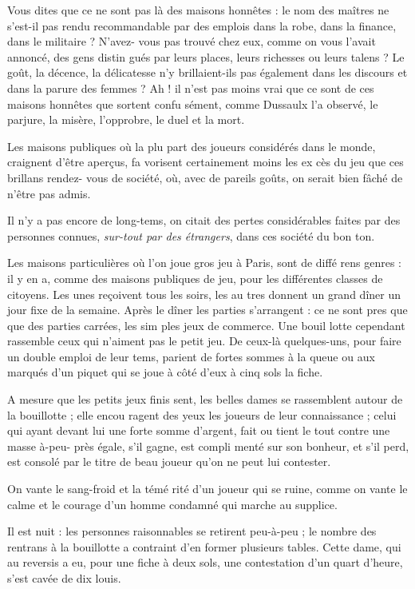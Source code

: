 Vous dites que ce ne sont pas là des
maisons honnêtes : le nom des maîtres
ne s'est-il pas rendu recommandable
par des emplois dans la robe, dans la
finance, dans le militaire ? N'avez-%
vous pas trouvé chez eux, comme on
vous l'avait annoncé, des gens distin%
gués par leurs places, leurs richesses
ou leurs talens ? Le goût, la décence,
la délicatesse n'y brillaient-ils pas
également dans les discours et dans
la parure des femmes ? Ah ! il n'est
pas moins vrai que ce sont de ces
maisons honnêtes que sortent confu%
sément, comme Dussaulx l'a observé,
le parjure, la misère, l'opprobre, le
duel et la mort.

Les maisons publiques où la plu%
part des joueurs considérés dans le
monde, craignent d'être aperçus, fa%
vorisent certainement moins les ex%
cès du jeu que ces brillans rendez-%
vous de société, où, avec de pareils
goûts, on serait bien fâché de n'être
pas admis.

Il n'y a pas encore de long-tems, on
citait des pertes considérables faites
par des personnes connues, \emph{sur-tout
par des étrangers}, dans ces société
du bon ton.

Les maisons particulières où l'on
joue gros jeu à Paris, sont de diffé%
rens genres : il y en a, comme des
maisons publiques de jeu, pour les
différentes classes de citoyens. Les
unes reçoivent tous les soirs, les au%
tres donnent un grand dîner un jour
fixe de la semaine. Après le dîner les
parties s'arrangent : ce ne sont pres%
que que des parties carrées, les sim%
ples jeux de commerce. Une bouil%
lotte cependant rassemble ceux qui
n'aiment pas le petit jeu. De ceux-là
quelques-uns, pour faire un double
emploi de leur tems, parient de fortes
sommes à la queue ou aux marqués
d'un piquet qui se joue à côté d'eux à
cinq sols la fiche.

A mesure que les petits jeux finis%
sent, les belles dames se rassemblent
autour de la bouillotte ; elle encou%
ragent des yeux les joueurs de leur 
connaissance ; celui qui ayant devant
lui une forte somme d'argent, fait ou
tient le tout contre une masse à-peu-%
près égale, s'il gagne, est compli%
menté sur son bonheur, et s'il perd,
est consolé par le titre de beau joueur
qu'on ne peut lui contester.

On vante le sang-froid et la témé%
rité d'un joueur qui se ruine, comme
on vante le calme et le courage d'un
homme condamné qui marche au
supplice.

Il est nuit : les personnes raisonnables
se retirent peu-à-peu ; le nombre des
rentrans à la bouillotte a contraint d'en
former plusieurs tables. Cette dame,
qui au reversis a eu, pour une fiche
à deux sols, une contestation d'un
quart d'heure, s'est cavée de dix louis.

